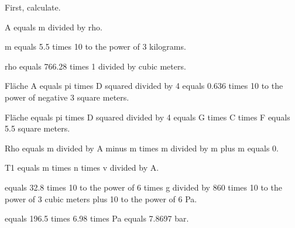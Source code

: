 First, calculate. 

A equals m divided by rho. 

m equals 5.5 times 10 to the power of 3 kilograms. 

rho equals 766.28 times 1 divided by cubic meters. 

Fläche A equals pi times D squared divided by 4 equals 0.636 times 10 to the power of negative 3 square meters. 

Fläche equals pi times D squared divided by 4 equals G times C times F equals 5.5 square meters. 

Rho equals m divided by A minus m times m divided by m plus m equals 0. 

T1 equals m times n times v divided by A. 

equals 32.8 times 10 to the power of 6 times g divided by 860 times 10 to the power of 3 cubic meters plus 10 to the power of 6 Pa. 

equals 196.5 times 6.98 times Pa equals 7.8697 bar.